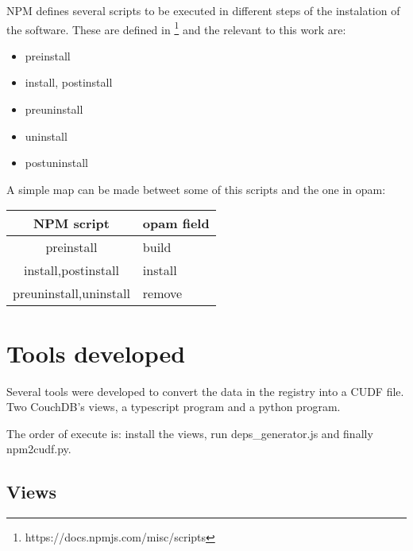 \documentclass[letterpaper,12pt]{report}
\begin{document}
NPM defines several scripts to be executed in different steps of the instalation
of the software. These are defined in
\footnote{https://docs.npmjs.com/misc/scripts} and the relevant to this work
are:

\begin{itemize}
    \item preinstall
    \item install, postinstall
    \item preuninstall
    \item uninstall
    \item postuninstall
\end{itemize}

A simple map can be made betweet some of this scripts and the one in opam:



\begin{tabularx}{\textwidth}{|c|X|}
        \hline
        NPM script              & opam field    \\ \hline \hline
        preinstall              & build         \\ \hline
        install,postinstall     & install       \\ \hline
        preuninstall,uninstall  & remove        \\ \hline
        \hline
\end{tabularx}



\section{Tools developed}

Several tools were developed to convert the data in the registry into a CUDF
file. Two CouchDB's views, a typescript program and a python program.

The order of execute is: install the views, run deps\_generator.js and finally
npm2cudf.py.

\subsection{Views}
\end{document}
